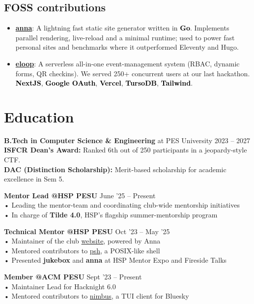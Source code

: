 \documentclass[a4,10pt]{article}
\newcommand{\tech}[1]{\textbf{\textcolor{black}{#1}}}
\begin{document}
\begin{small}
\section{FOSS contributions}
\begin{itemize}[nolistsep, nosep, partopsep=0pt, leftmargin=1.2em, labelsep=0.6em, itemsep=0pt, topsep=0pt, parsep=0pt]
	\item \textbf{\href{https://github.com/anna-ssg/anna}{anna}}: A lightning fast static site generator written in \tech{Go}. Implements parallel rendering, live-reload and a minimal runtime; used to power fast personal sites and benchmarks where it outperformed Eleventy and Hugo.
	\item \textbf{\href{https://github.com/homebrew-ec-foss/eloop}{eloop}}: A serverless all-in-one event-management system (RBAC, dynamic forms, QR checkins). We served 250+ concurrent users at our last hackathon. \tech{NextJS}, \tech{Google OAuth}, \tech{Vercel}, \tech{TursoDB}, \tech{Tailwind}.
\end{itemize}
\end{small}

\section{Education}
\textbf{B.Tech in Computer Science \& Engineering} at PES University \hfill 2023 – 2027 \\
\textbf{ISFCR Dean's Award:} Ranked 6th out of 250 participants in a jeopardy-style CTF. \\
\textbf{DAC (Distinction Scholarship):} Merit-based scholarship for academic excellence in Sem 5.

\textbf{Mentor Lead @HSP PESU} \hfill June '25 – Present \\
• Leading the mentor-team and coordinating club-wide mentorship initiatives \\
• In charge of \textbf{Tilde 4.0}, HSP's flagship summer-mentorship program

\textbf{Technical Mentor @HSP PESU} \hfill Oct '23 – May '25 \\
• Maintainer of the club \href{https://hsp-ec.xyz}{website}, powered by Anna \\
• Mentored contributors to \href{https://github.com/homebrew-ec-foss/psh}{psh}, a POSIX-like shell \\
• Presented \textbf{jukebox} and \textbf{anna} at HSP Mentor Expo and Fireside Talks

\textbf{Member @ACM PESU} \hfill Sept '23 – Present \\
• Maintainer Lead for Hacknight 6.0 \\
• Mentored contributors to \href{https://github.com/polarhive/nimbus}{nimbus}, a TUI client for Bluesky

\end{document}

